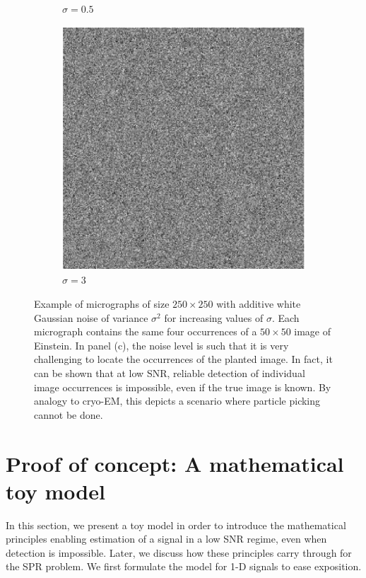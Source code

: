\documentclass[9pt,twocolumn,twoside,lineno]{pnas-new}
\begin{document}
\begin{figure}[h]
\begin{subfigure}[h]{0.33\textwidth}
		\caption{$\sigma = 0.5$}
	\end{subfigure}
	\begin{subfigure}[h]{0.33\textwidth}
		\centering
		\includegraphics[scale=0.5]{micrograph_Einstein_example_s3}
		\caption{$\sigma = 3$}
	\end{subfigure}
	\caption{\label{fig:micro_example} Example of micrographs of size $250\times 250$ with additive white Gaussian noise of variance $\sigma^2$ for increasing values of $\sigma$. Each micrograph contains the same four occurrences of a $50 \times 50$ image of Einstein. In panel (c), the noise level is such that it is very challenging to locate the occurrences of the planted image. In fact, it can be shown that at low SNR, reliable detection of individual image occurrences is impossible, even if the true image is known. By analogy to cryo-EM, this depicts a scenario where particle picking cannot be done.}	
\end{figure}


\section{Proof of concept: A mathematical toy model}

In this section, we present a toy model in order to introduce the mathematical principles enabling estimation of a signal in a low SNR regime, even when detection is impossible. Later, we discuss how these principles carry through for the SPR problem. We first formulate the model for 1-D signals to ease exposition.
\end{document}
